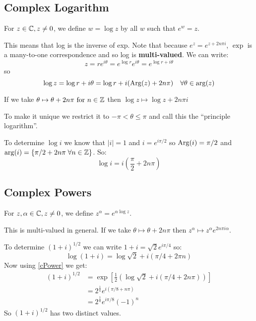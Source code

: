 \documentclass[../main.tex]{subfiles}
\begin{document}
\subsection{Complex Logarithm}
\begin{definition}
  For $z \in \mathbb{C}, z \neq 0$, we define $w = \log z$ by all $w$ such that $e^{w} = z$.
\end{definition}
This means that log is the inverse of exp.
Note that because $e^{z} = e^{z + 2n\pi i}$, $\exp$ is a many-to-one correspondence and so log is \textbf{multi-valued}.
We can write:
\[
  z = re^{i\theta} = e^{\log r} e^{i \theta} = e^{\log r + i\theta}
\]
so
\[
  \log z = \log r + i\theta = \log r + i(\operatorname{Arg}(z) + 2n\pi)\quad\forall \theta \in \arg(z)
\]
\begin{remark}
  If we take $\theta \mapsto \theta + 2n\pi \text{ for } n \in \mathbb{Z}$ then $\log z \mapsto \log z + 2n\pi i$

  To make it unique we restrict it to $-\pi < \theta \leq \pi$ and call this the ``principle logarithm''.
\end{remark}
\begin{example}
  To determine $\log i$ we know that $|i| = 1$ and $i = e^{i\pi/2}$ so $\operatorname{Arg}(i) = \pi/2$ and $\arg(i) = \{\pi/2 + 2n\pi\;\forall n \in \mathbb{Z}\}$. So:
  \[
    \log i = i\left(\frac{\pi}{2} + 2n\pi\right)
  \]
\end{example}
\subsection{Complex Powers}
\begin{definition}
  For $z, \alpha \in \mathbb{C}, z\neq0$, we define $z^{\alpha} = e^{\alpha \log z}$.
  \label{cPower}
\end{definition}
This is multi-valued in general.
If we take $\theta \mapsto \theta + 2n\pi$ then $z^{\alpha} \mapsto z^{\alpha}e^{2n\pi i \alpha}$.
\begin{example}
  To determine $(1 + i)^{1/2}$ we can write $1 + i = \sqrt{2}e^{i\pi/4}$ so:
  \[
    \log(1 + i) = \log \sqrt{2} + i(\pi/4 + 2\pi n)
  \]
  Now using \cref{cPower} we get:
  \begin{align*}
    (1 + i)^{1/2} &= \exp\left[\frac{1}{2}\left(\log \sqrt{2} + i(\pi/4 + 2n\pi)\right)\right] \\
                  &= 2^{\frac{1}{4}} e^{i(\pi/8 + n\pi)} \\
                  &= 2^{\frac{1}{4}} e^{i\pi/8} (-1)^{n}
  \end{align*}
  So $(1 + i)^{1/2}$ has two distinct values.
\end{example}
\end{document}
